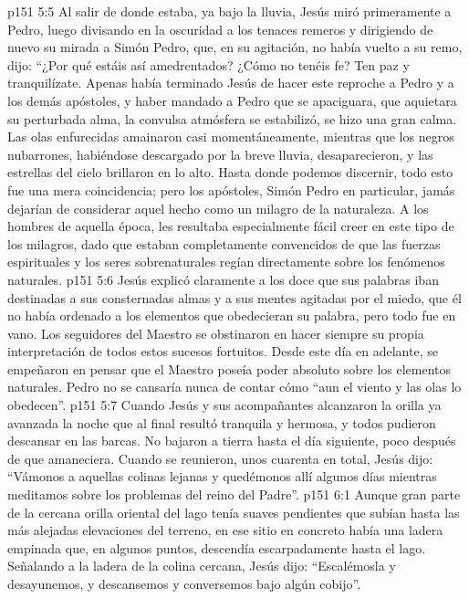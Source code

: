 \vs p151 5:5 Al salir de donde estaba, ya bajo la lluvia, Jesús miró primeramente a Pedro, luego divisando en la oscuridad a los tenaces remeros y dirigiendo de nuevo su mirada a Simón Pedro, que, en su agitación, no había vuelto a su remo, dijo: “¿Por qué estáis así amedrentados? ¿Cómo no tenéis fe? Ten paz y tranquilízate. Apenas había terminado Jesús de hacer este reproche a Pedro y a los demás apóstoles, y haber mandado a Pedro que se apaciguara, que aquietara su perturbada alma, la convulsa atmósfera se estabilizó, se hizo una gran calma. Las olas enfurecidas amainaron casi momentáneamente, mientras que los negros nubarrones, habiéndose descargado por la breve lluvia, desaparecieron, y las estrellas del cielo brillaron en lo alto. Hasta donde podemos discernir, todo esto fue una mera coincidencia; pero los apóstoles, Simón Pedro en particular, jamás dejarían de considerar aquel hecho como un milagro de la naturaleza. A los hombres de aquella época, les resultaba especialmente fácil creer en este tipo de los milagros, dado que estaban completamente convencidos de que las fuerzas espirituales y los seres sobrenaturales regían directamente sobre los fenómenos naturales.
\vs p151 5:6 Jesús explicó claramente a los doce que sus palabras iban destinadas a sus consternadas almas y a sus mentes agitadas por el miedo, que él no había ordenado a los elementos que obedecieran su palabra, pero todo fue en vano. Los seguidores del Maestro se obstinaron en hacer siempre su propia interpretación de todos estos sucesos fortuitos. Desde este día en adelante, se empeñaron en pensar que el Maestro poseía poder absoluto sobre los elementos naturales. Pedro no se cansaría nunca de contar cómo “aun el viento y las olas lo obedecen”.
\vs p151 5:7 Cuando Jesús y sus acompañantes alcanzaron la orilla ya avanzada la noche que al final resultó tranquila y hermosa, y todos pudieron descansar en las barcas. No bajaron a tierra hasta el día siguiente, poco después de que amaneciera. Cuando se reunieron, unos cuarenta en total, Jesús dijo: “Vámonos a aquellas colinas lejanas y quedémonos allí algunos días mientras meditamos sobre los problemas del reino del Padre”.
\vs p151 6:1 Aunque gran parte de la cercana orilla oriental del lago tenía suaves pendientes que subían hasta las más alejadas elevaciones del terreno, en ese sitio en concreto había una ladera empinada que, en algunos puntos, descendía escarpadamente hasta el lago. Señalando a la ladera de la colina cercana, Jesús dijo: “Escalémosla y desayunemos, y descansemos y conversemos bajo algún cobijo”.
